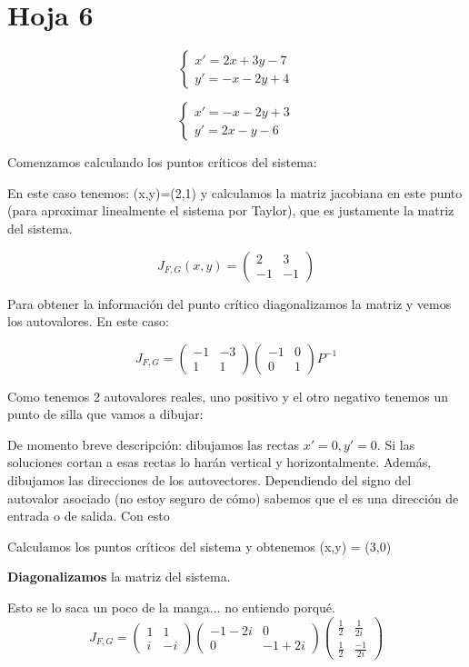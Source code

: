 \documentclass[nochap]{apuntes}
\begin{document}
\section{Hoja 6}
\begin{problem}[1]
\ppart 
\[\left\{ \begin{array}{c}
x'=2x+3y-7\\y'=-x-2y+4
\end{array}\right.\]

\ppart \[\left\{
\begin{array}{c}
x'=-x-2y+3\\y'=2x-y-6
\end{array}\right.\]

\solution
\spart
Comenzamos calculando los puntos críticos del sistema:

En este caso tenemos: (x,y)=(2,1) y calculamos la matriz jacobiana en este punto (para aproximar linealmente el sistema por Taylor), que es justamente la matriz del sistema.

\[J_{F,G} (x,y) = \begin{pmatrix}
2&3\\-1&-1
\end{pmatrix}\]

Para obtener la información del punto crítico diagonalizamos la matriz y vemos los autovalores. En este caso:

\[J_{F,G} = \begin{pmatrix}
-1&-3\\1&1
\end{pmatrix}\begin{pmatrix}
-1 &0\\0&1
\end{pmatrix}P^{-1}\]

Como tenemos 2 autovalores reales, uno positivo y el otro negativo tenemos un punto de silla que vamos a dibujar: 

De momento breve descripción: dibujamos las rectas $x'=0,y'=0$. Si las soluciones cortan a esas rectas lo harán vertical y horizontalmente. Además, dibujamos las direcciones de los autovectores. Dependiendo del signo del autovalor asociado (no estoy seguro de cómo) sabemos que el es una dirección de entrada o de salida. Con esto 

\spart
Calculamos los puntos críticos del sistema y obtenemos (x,y) = (3,0)

\textbf{Diagonalizamos} la matriz del sistema.

Esto se lo saca un poco de la manga... no entiendo porqué.
\[J_{F,G} = \begin{pmatrix}
1&1\\i&-i
\end{pmatrix}
\begin{pmatrix}
-1-2i&0\\0&-1+2i
\end{pmatrix}\begin{pmatrix}
\frac{1}{2}&\frac{1}{2i}\\
\frac{1}{2}&\frac{-1}{2i}
\end{pmatrix}
\]


\end{problem}
\end{document}
